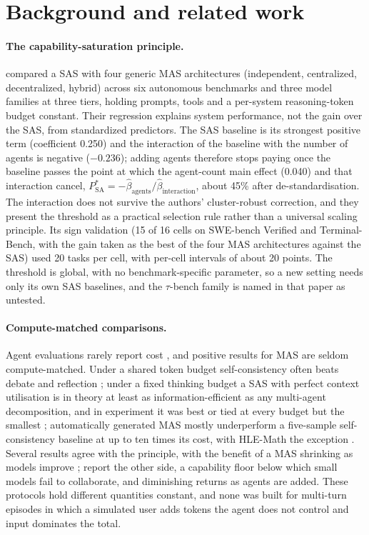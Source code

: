 \section{Background and related work}
\label{sec:related}

\paragraph{The capability-saturation principle.} \citet{kim2026capable} compared a SAS with four generic MAS architectures (independent, centralized, decentralized, hybrid) across six autonomous benchmarks and three model families at three tiers, holding prompts, tools and a per-system reasoning-token budget constant. Their regression explains system performance, not the gain over the SAS, from standardized predictors. The SAS baseline is its strongest positive term (coefficient 0.250) and the interaction of the baseline with the number of agents is negative ($-0.236$); adding agents therefore stops paying once the baseline passes the point at which the agent-count main effect (0.040) and that interaction cancel, $P^{\ast}_{\mathrm{SA}} = -\hat\beta_{\text{agents}}/\hat\beta_{\text{interaction}}$, about 45\% after de-standardisation. The interaction does not survive the authors' cluster-robust correction, and they present the threshold as a practical selection rule rather than a universal scaling principle. Its sign validation (15 of 16 cells on SWE-bench Verified and Terminal-Bench, with the gain taken as the best of the four MAS architectures against the SAS) used 20 tasks per cell, with per-cell intervals of about 20 points. The threshold is global, with no benchmark-specific parameter, so a new setting needs only its own SAS baselines, and the $\tau$-bench family is named in that paper as untested.

\paragraph{Compute-matched comparisons.} Agent evaluations rarely report cost \citep{kapoor2024agents,kapoor2025hal}, and positive results for MAS are seldom compute-matched. Under a shared token budget self-consistency often beats debate and reflection \citep{wang2024token}; under a fixed thinking budget a SAS with perfect context utilisation is in theory at least as information-efficient as any multi-agent decomposition, and in experiment it was best or tied at every budget but the smallest \citep{tran2026single}; automatically generated MAS mostly underperform a five-sample self-consistency baseline at up to ten times its cost, with HLE-Math the exception \citep{jwalapuram2026illusion}. Several results agree with the principle, with the benefit of a MAS shrinking as models improve \citep{gao2025single,yang2025debate,yu2026bottleneck}; \citet{li2026scaling} report the other side, a capability floor below which small models fail to collaborate, and diminishing returns as agents are added. These protocols hold different quantities constant, and none was built for multi-turn episodes in which a simulated user adds tokens the agent does not control and input dominates the total.

